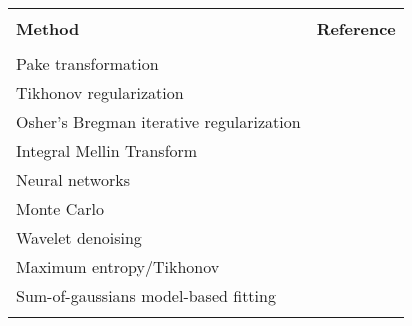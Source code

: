 

\begin{center}
\begin{tabular}{l r}
\toprule \\
\textbf{Method} & \textbf{Reference} \\
\midrule \\
Pake transformation &	\citep*{Jeschke2002} \\
Tikhonov regularization &	\citep*{Chiang2005, Jeschke2004} \\
Osher’s Bregman iterative regularization &	\citep*{FabregasIbanez2019} \\
Integral Mellin Transform &	\citep*{Matveeva2017} \\
Neural networks &	\citep*{Worswick2018} \\
Monte Carlo &	\citep*{Dzuba2016} \\
Wavelet denoising &	\citep*{Srivastava2016} \\
Maximum entropy/Tikhonov &	\citep*{Chiang2005a} \\
Sum-of-gaussians model-based fitting & \citep*{Brandon2012, Stein2015} \\
\bottomrule \\
\end{tabular} 
\end{center}



